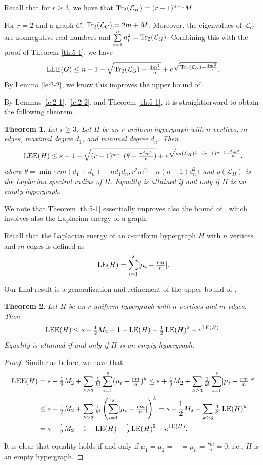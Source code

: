 \documentclass[11pt]{article}
\newtheorem{theorem}{Theorem}[section]
\def\LEE{\mathop{\rm LEE }\nolimits}
\def\LE{\mathop{\rm LE }\nolimits}
\def\Tr{\mathop{\rm Tr }\nolimits}
\begin{document}
Recall that for $r \geq 3$, we have that $\Tr_{2}(\mathcal{L}_{H})=(r-1)^{n-1}M$.

For $r=2$ and a graph $G$, $\Tr_{2}(\mathcal{L}_{G})=2m+M$. Moreover, the eigenvalues of $\mathcal{L}_{G}$ are nonnegative real numbers and $\sum\limits_{i=1}^{n}a_{i}^{2} =\Tr_{2}(\mathcal{L}_{G}).$ Combining this with the proof of Theorem \ref{th:5-1}, we have $$\LEE(G) \leq n-1-\sqrt{\Tr_{2}(\mathcal{L}_{G})-\tfrac{4m^{2}}{n}}+e^{\sqrt{\Tr_{2}(\mathcal{L}_{G})-\frac{4m^{2}}{n}}}.$$ By Lemma \ref{le:2-2}, we know this improves the upper bound of \cite[Thm.~5]{LSC}.

By Lemmas \ref{le:2-1}, \ref{le:2-2}, and Theorem \ref{th:5-1}, it is straightforward to obtain the following theorem.
\noindent\begin{theorem}\label{th:5-2}
Let $r \geq 3$. Let $H$ be an $r$-uniform hypergraph with $n$ vertices, $m$ edges, maximal degree $d_{1}$, and minimal degree $d_{n}$. Then
$$\LEE(H) \leq s-1-\sqrt{(r-1)^{n-1}(\theta-\tfrac{r^{2}m^{2}}{n})}+e^{\sqrt{s\rho(\mathcal{L}_{H})^{2}-(r-1)^{n-1}\frac{r^{2}m^{2}}{n}}},$$
where $\theta=\min\{rm(d_{1}+d_{n})-nd_{1}d_{n}, r^{2}m^{2}-n(n-1)d_{n}^{2}\}$ and $\rho(\mathcal{L}_{H})$ is the Laplacian spectral radius of $H$. Equality is attained if and only if $H$ is an empty hypergraph.
\end{theorem}

We note that Theorem \ref{th:5-1} essentially improves also the bound of \cite[Eq.~17]{LSC}, which involves also the Laplacian energy of a graph.

Recall that the Laplacian energy of an $r$-uniform hypergraph $H$ with $n$ vertices and $m$ edges is defined as $$\LE(H)=\sum_{i=1}^{s}\lvert \mu_{i}-\tfrac{rm}{n}\rvert.$$

Our final result is a generalization and refinement of the upper bound of \cite[Eq.~18]{LSC}.

\noindent\begin{theorem}\label{th:5-4}
Let $H$ be an $r$-uniform hypergraph with $n$ vertices and $m$ edges. Then
$$\LEE(H) \leq s+\tfrac{1}{2}M_{2}-1-\LE(H)-\tfrac{1}{2}\LE(H)^{2}+e^{\LE(H)}.$$
Equality is attained if and only if $H$ is an empty hypergraph.
\end{theorem}

\begin{proof}  Similar as before, we have that
\begin{align*}
\LEE(H)& = s+\tfrac{1}{2}M_{2}+\sum\limits_{k\geq 3}\tfrac{1}{k!}\sum_{i=1}^{s}(\mu_{i}-\tfrac{rm}{n})^{k}\leq s+\tfrac{1}{2}M_{2}+\sum\limits_{k\geq 3}\tfrac{1}{k!}\sum_{i=1}^{s}\lvert \mu_{i}-\tfrac{rm}{n}\rvert^{k}\\
&\leq s+\tfrac{1}{2}M_{2}+\sum\limits_{k\geq 3}\tfrac{1}{k!}\left(\sum_{i=1}^{s}\lvert \mu_{i}-\tfrac{rm}{n}\rvert\right)^{k}=s+\frac{1}{2}M_{2}+\sum\limits_{k\geq 3}\tfrac{1}{k!}\LE(H)^{k}\\&=s+\tfrac{1}{2}M_{2}-1-\LE(H)-\tfrac{1}{2}\LE(H)^{2}+e^{\LE(H)}.
\end{align*}

It is clear that equality holds if and only if $\mu_{1}=\mu_{2}=\cdots=\mu_{n}=\tfrac{rm}{n}=0$, i.e., $H$ is an empty hypergraph.
\end{proof}
\end{document}
